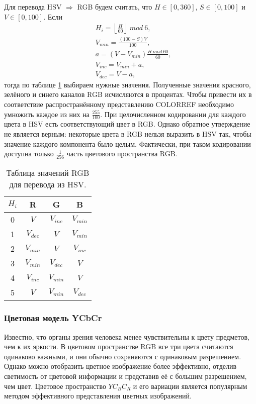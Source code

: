 Для перевода HSV $\Rightarrow$ RGB будем считать, что $H \in [0,360]$, $S \in [0, 100]$ и
$V \in [0, 100]$. Если
\begin{equation}
	\begin{aligned}
	&H_i = \left\lfloor \frac{H}{60} \right\rfloor~mod~6, \\
	&V_{min} = \frac{(100-S)V}{100}, \\
	&a = (V-V_{min})\frac{H~mod~60}{60}, \\
	&V_{inc} = V_{min} + a, \\
	&V_{dec} = V-a,
\end{aligned}
\label{hsv-to-rgb}
\end{equation}
тогда по таблице \ref{rgb-hsv-table} выбираем нужные значения. Полученные значения красного, зелёного
и синего каналов RGB исчисляются в процентах. Чтобы привести их в соответствие распространённому
представлению COLORREF необходимо умножить каждое из них на $\displaystyle\frac{255}{100}$.
При целочисленном кодировании для каждого цвета в HSV есть соответствующий цвет в RGB. Однако
обратное утверждение не является верным: некоторые цвета в RGB нельзя выразить в HSV так, чтобы
значение каждого компонента было целым. Фактически, при таком кодировании доступна только
$\displaystyle\frac{1}{256}$ часть цветового пространства RGB. 

\begin{table}[ht]
	\centering
	\begin{tabular}
		{|c|c|c|c|}
		\hline $H_i$ & R & G & B \\ \hline 
		0 & $V$ & $V_{inc}$ & $V_{min}$ \\ \hline 
		1 & $V_{dec}$ & $V$ & $V_{min}$ \\ \hline 
		2 & $V_{min}$ & $V$ & $V_{inc}$ \\ \hline 
		3 & $V_{min}$ & $V_{dec}$ & $V$ \\ \hline 
		4 & $V_{inc}$ & $V_{min}$ & $V$ \\ \hline 
		5 & $V$ & $V_{min}$ & $V_{dec}$ \\ \hline 
	\end{tabular}
	\caption{Таблица значений RGB для перевода из HSV.}
	\label{rgb-hsv-table}
\end{table}

\subsubsection{Цветовая модель YCbCr}

Известно, что органы зрения человека менее чувствительны к цвету предметов, чем к их яркости. В
цветовом пространстве RGB все три цвета считаются одинаково важными, и они обычно сохраняются
с одинаковым разрешением. Однако можно отобразить цветное изображение более эффективно, 
отделив светимость от цветовой информации и представив её с большим разрешением, чем цвет.
Цветовое пространство $YC_BC_R$ и его вариации является популярным методом эффективного
представления цветных изображений.

